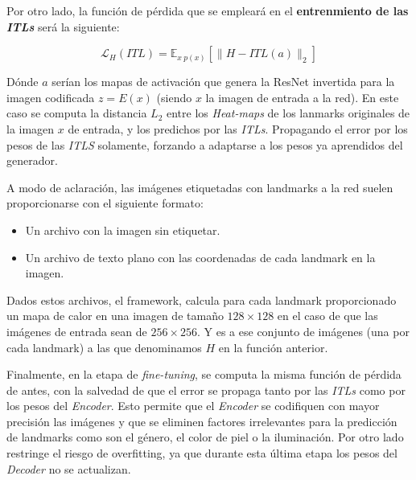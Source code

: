             \medskip

            \noindent Por otro lado, la función de pérdida que se empleará en el \textbf{entrenmiento de las \textit{ITLs}} será la siguiente: 

            \begin{equation*} \label{eq::L2}
                \mathcal{L}_H(ITL) = \mathbb{E}_{x ~ p(x)} \left[ \| H-ITL(a)\|_2 \right]
            \end{equation*}

            \noindent Dónde $a$ serían los mapas de activación que genera la ResNet invertida para la imagen codificada $z=E(x)$ (siendo $x$ la imagen de entrada a la red). En este caso se computa la distancia \textbf{$L_2$} entre los \textit{Heat-maps} de los lanmarks originales de la imagen $x$ de entrada, y los predichos por las \textit{ITLs}. Propagando el error por los pesos de las \textit{ITLS} solamente, forzando a adaptarse a los pesos ya aprendidos del generador.

            \medskip

            \noindent A modo de aclaración, las imágenes etiquetadas con landmarks a la red suelen proporcionarse con el siguiente formato: 

            \begin{itemize}
                \item Un archivo con la imagen sin etiquetar. 
                \item Un archivo de texto plano con las coordenadas de cada landmark en la imagen.
            \end{itemize}

            \noindent Dados estos archivos, el framework, calcula para cada landmark proporcionado un mapa de calor en una imagen de tamaño $128 \times 128$ en el caso de que las imágenes de entrada sean de $256 \times 256$. Y es a ese conjunto de imágenes (una por cada landmark) a las que denominamos $H$ en la función anterior.

            \medskip

            \noindent Finalmente, en la etapa de \textit{fine-tuning}, se computa la misma función de pérdida de antes, con la salvedad de que el error se propaga tanto por las \textit{ITLs} como por los pesos del \textit{Encoder}. Esto permite que el \textit{Encoder} se codifiquen con mayor precisión las imágenes y que se eliminen factores irrelevantes para la predicción de landmarks como son el género, el color de piel o la iluminación. Por otro lado restringe el riesgo de overfitting, ya que durante esta última etapa los pesos del \textit{Decoder} no se actualizan.

